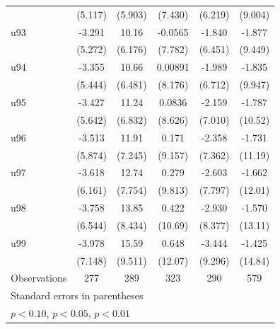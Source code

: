 \begin{table}[htbp]
\begin{tabular}{l*{5}{c}}
                    &     (5.117)         &     (5.903)         &     (7.430)         &     (6.219)         &     (9.004)         \\
\addlinespace
u93                 &      -3.291         &       10.16\sym{*}  &     -0.0565         &      -1.840         &      -1.877         \\
                    &     (5.272)         &     (6.176)         &     (7.782)         &     (6.451)         &     (9.449)         \\
\addlinespace
u94                 &      -3.355         &       10.66\sym{*}  &     0.00891         &      -1.989         &      -1.835         \\
                    &     (5.444)         &     (6.481)         &     (8.176)         &     (6.712)         &     (9.947)         \\
\addlinespace
u95                 &      -3.427         &       11.24\sym{*}  &      0.0836         &      -2.159         &      -1.787         \\
                    &     (5.642)         &     (6.832)         &     (8.626)         &     (7.010)         &     (10.52)         \\
\addlinespace
u96                 &      -3.513         &       11.91         &       0.171         &      -2.358         &      -1.731         \\
                    &     (5.874)         &     (7.245)         &     (9.157)         &     (7.362)         &     (11.19)         \\
\addlinespace
u97                 &      -3.618         &       12.74         &       0.279         &      -2.603         &      -1.662         \\
                    &     (6.161)         &     (7.754)         &     (9.813)         &     (7.797)         &     (12.01)         \\
\addlinespace
u98                 &      -3.758         &       13.85         &       0.422         &      -2.930         &      -1.570         \\
                    &     (6.544)         &     (8.434)         &     (10.69)         &     (8.377)         &     (13.11)         \\
\addlinespace
u99                 &      -3.978         &       15.59         &       0.648         &      -3.444         &      -1.425         \\
                    &     (7.148)         &     (9.511)         &     (12.07)         &     (9.296)         &     (14.84)         \\
\midrule
Observations        &         277         &         289         &         323         &         290         &         579         \\
\bottomrule
\multicolumn{6}{l}{\footnotesize Standard errors in parentheses}\\
\multicolumn{6}{l}{\footnotesize \sym{*} \(p<0.10\), \sym{**} \(p<0.05\), \sym{***} \(p<0.01\)}\\
\end{tabular}
\end{table}
